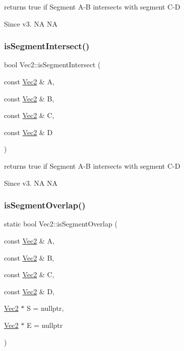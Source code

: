 returns true if Segment A-\/B intersects with segment C-\/D \begin{DoxySince}{Since}
v3.  NA  NA 
\end{DoxySince}
\mbox{\label{classVec2_a2f6e61e0994a71c17e6ba614e1d81c06}} 
\subsubsection{\texorpdfstring{is\+Segment\+Intersect()}{isSegmentIntersect()}\hspace{0.1cm}{\footnotesize\ttfamily [2/2]}}
{\footnotesize\ttfamily bool Vec2\+::is\+Segment\+Intersect (\begin{DoxyParamCaption}\item[{const \hyperlink{classVec2}{Vec2} \&}]{A,  }\item[{const \hyperlink{classVec2}{Vec2} \&}]{B,  }\item[{const \hyperlink{classVec2}{Vec2} \&}]{C,  }\item[{const \hyperlink{classVec2}{Vec2} \&}]{D }\end{DoxyParamCaption})\hspace{0.3cm}{\ttfamily [static]}}

returns true if Segment A-\/B intersects with segment C-\/D \begin{DoxySince}{Since}
v3.  NA  NA 
\end{DoxySince}
\mbox{\label{classVec2_a28c2d3ea6d0012ef5d41b024e91462ed}} 
\subsubsection{\texorpdfstring{is\+Segment\+Overlap()}{isSegmentOverlap()}\hspace{0.1cm}{\footnotesize\ttfamily [1/2]}}
{\footnotesize\ttfamily static bool Vec2\+::is\+Segment\+Overlap (\begin{DoxyParamCaption}\item[{const \hyperlink{classVec2}{Vec2} \&}]{A,  }\item[{const \hyperlink{classVec2}{Vec2} \&}]{B,  }\item[{const \hyperlink{classVec2}{Vec2} \&}]{C,  }\item[{const \hyperlink{classVec2}{Vec2} \&}]{D,  }\item[{\hyperlink{classVec2}{Vec2} $\ast$}]{S = {\ttfamily nullptr},  }\item[{\hyperlink{classVec2}{Vec2} $\ast$}]{E = {\ttfamily nullptr} }\end{DoxyParamCaption})\hspace{0.3cm}{\ttfamily [static]}}

